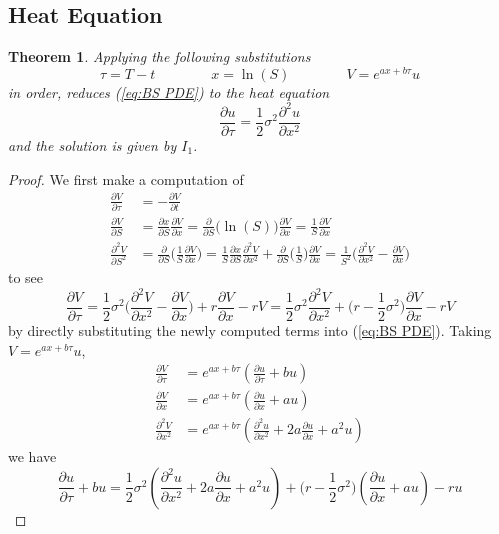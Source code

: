 \documentclass[12pt]{article}
\newtheorem{theorem}{Theorem}
\theoremstyle{definition}
\theoremstyle{remark}
\begin{document}
\subsection{Heat Equation}
\begin{theorem}
\label{thm: heat equ solution}
	Applying the following substitutions
	$$
	\tau = T-t
	\qquad\qquad
	x = \ln (S)
	\qquad\qquad
	V = e^{ax + b\tau} u
	$$
	in order, reduces (\ref{eq:BS PDE}) to the heat equation
	$$
	\frac{\partial u}{\partial \tau} = \frac{1}{2} \sigma^{2} \frac{\partial^2 u}{\partial x^2}
	$$
	and the solution is given by $I_1$.
\end{theorem}
\begin{proof}
	We first make a computation of
	\begin{align*}
		\frac{\partial V}{\partial \tau}
		&= - \frac{\partial V}{\partial t} \\
		\frac{\partial V}{\partial S}
		&= \frac{\partial x}{\partial S} \frac{\partial V}{\partial x} = \frac{\partial}{\partial S} \big( \ln(S) \big) \frac{\partial V}{\partial x} = \frac{1}{S} \frac{\partial V}{\partial x} \\
		\frac{\partial^2 V}{\partial S^2}
		&= \frac{\partial}{\partial S} \Big( \frac{1}{S} \frac{\partial V}{\partial x} \Big) = \frac{1}{S} \frac{\partial x}{\partial S} \frac{\partial^2 V}{\partial x^2} + \frac{\partial}{\partial S} \Big( \frac{1}{S} \Big) \frac{\partial V}{\partial x} = \frac{1}{S^2} \Big( \frac{\partial^2 V}{\partial x^2} - \frac{\partial V}{\partial x} \Big)
	\end{align*}
	to see
	$$
	\frac{\partial V}{\partial \tau} = \frac{1}{2} \sigma^{2} \Big( \frac{\partial^2 V}{\partial x^2} - \frac{\partial V}{\partial x} \Big) + r \frac{\partial V}{\partial x} - rV = \frac{1}{2} \sigma^{2} \frac{\partial^2 V}{\partial x^2} + \Big( r - \frac{1}{2} \sigma^2 \Big) \frac{\partial V}{\partial x} - rV
	$$
	by directly substituting the newly computed terms into (\ref{eq:BS PDE}). Taking $V = e^{ax + b\tau} u$,
	\begin{align*}
		\frac{\partial V}{\partial \tau} &= e^{ax + b\tau} \left( \frac{\partial u}{\partial \tau} + bu \right) \\
		\frac{\partial V}{\partial x} &= e^{ax + b\tau} \left( \frac{\partial u}{\partial x} + au \right) \\
		\frac{\partial^2 V}{\partial x^2} &= e^{ax + b\tau} \left( \frac{\partial^2 u}{\partial x^2} + 2a \frac{\partial u}{\partial x} + a^2u \right)
	\end{align*}
	we have
	$$
	\frac{\partial u}{\partial \tau} + bu = \frac{1}{2} \sigma^{2} \left( \frac{\partial^2 u}{\partial x^2} + 2a \frac{\partial u}{\partial x} + a^2u \right) + \Big( r - \frac{1}{2} \sigma^2 \Big) \left(  \frac{\partial u}{\partial x} + au \right) - ru
$$
\end{proof}
\end{document}
